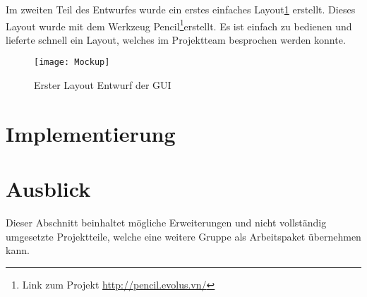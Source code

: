 Im zweiten Teil des Entwurfes wurde ein erstes einfaches Layout\ref{fig:gui} erstellt. Dieses Layout wurde mit dem Werkzeug Pencil\footnote{Link zum Projekt \url{http://pencil.evolus.vn/}}erstellt. Es ist einfach zu bedienen und lieferte schnell ein Layout, welches im Projektteam besprochen werden konnte.

\begin{figure}[h]
	\centering
		\texttt{[image: Mockup]}
		\caption{Erster Layout Entwurf der GUI}
		\label{fig:gui}
\end{figure}


\section{Implementierung}
 
\section{Ausblick}
Dieser Abschnitt beinhaltet mögliche Erweiterungen und nicht vollständig umgesetzte Projektteile, welche eine weitere Gruppe als Arbeitspaket übernehmen kann. 




